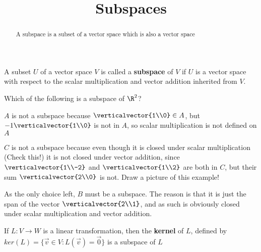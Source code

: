 \documentclass{ximera}
\title{Subspaces}
\begin{document}
\begin{abstract}
	A subspace is a subset of a vector space which is also a vector space
\end{abstract}

\begin{definition}
	A subset $U$ of a vector space $V$ is called a \textbf{subspace} of $V$ if $U$ is a vector space with respect to
	the scalar multiplication and vector addition inherited from $V$.
\end{definition}

\begin{question}
	Which of the following is a subspace of $\R^2$?
	\begin{solution}
		\begin{hint}
			$A$ is not a subspace because $\verticalvector{1\\0} \in A$, but $-1\verticalvector{1\\0}$ is not in $A$, so scalar multiplication is not defined on
			$A$
		\end{hint}
		\begin{hint}
			$C$ is not a subspace because even though it is closed under scalar multiplication (Check this!) it is not closed under vector addition, since
			$\verticalvector{1\\-2}$ and $\verticalvector{1\\2}$ are both in $C$, but their sum $\verticalvector{2\\0}$ is not.  Draw a picture of this example!
		\end{hint}
		\begin{hint}
			As the only choice left, $B$ must be a subspace.  The reason is that it is just the span of the vector $\verticalvector{2\\1}$, and as such is obviously closed under 
			scalar multiplication and vector addition.
		\end{hint}
	\begin{multiple-choice}
	\end{multiple-choice}
	\end{solution}
\end{question}


\begin{theorem}
	If $L:V \to W$ is a linear transformation, then the \textbf{kernel} of $L$, defined by $ker(L) = \{\vec{v} \in V:L(\vec{v}) = \vec{0}\}$ is a subspace of $L$
\end{theorem}
\end{document}
